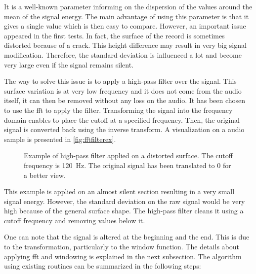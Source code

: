It is a well-known parameter informing on the dispersion of the values around the mean of the signal energy. The main advantage of using this parameter is that it gives a single value which is then easy to compare. However, an important issue appeared in the first tests. In fact, the surface of the record is sometimes distorted because of a crack. This height difference may result in very big signal modification. Therefore, the standard deviation is influenced a lot and become very large even if the signal remains silent.

The way to solve this issue is to apply a high-pass filter over the signal. This surface variation is at very low frequency and it does not come from the audio itself, it can then be removed without any loss on the audio. It has been chosen to use the \gls{fft} to apply the filter. Transforming the signal into the frequency domain enables to place the cutoff at a specified frequency. Then, the original signal is converted back using the inverse transform. A visualization on a audio sample is presented in \autoref{fig:fftfilterex}.

\begin{figure}[!ht]
\centering
{}
\caption[Example of high-pass filter applied on a distorted surface.]
{Example of high-pass filter applied on a distorted surface. The cutoff frequency is 120~Hz. The original signal has been translated to 0 for a better view.}
\label{fig:fftfilterex}
\end{figure}

This example is applied on an almost silent section resulting in a very small signal energy. However, the standard deviation on the raw signal would be very high because of the general surface shape. The high-pass filter cleans it using a cutoff frequency and removing values below it.

One can note that the signal is altered at the beginning and the end. This is due to the transformation, particularly to the window function. The details about applying \gls{fft} and windowing is explained in the next subsection. The algorithm using existing routines can be summarized in the following steps:

